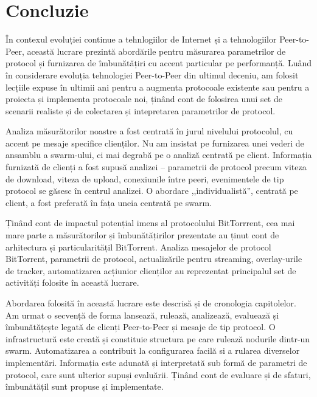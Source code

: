 
\chapter{Concluzie}
\label{chapter:conclusion}

În contexul evoluției continue a tehnlogiilor de Internet și a tehnologiilor
Peer-to-Peer, această lucrare prezintă abordările pentru măsurarea
parametrilor de protocol și furnizarea de îmbunătățiri cu accent particular pe
performanță. Luând în considerare evoluția tehnologiei Peer-to-Peer din
ultimul deceniu, am folosit lecțiile expuse în ultimii ani pentru a augmenta
protocoale existente sau pentru a proiecta și implementa protocoale noi, ținând
cont de folosirea unui set de scenarii realiste și de colectarea și
intepretarea parametrilor de protocol.

Analiza măsurătorilor noastre a fost centrată în jurul nivelului protocolul, cu
accent pe mesaje specifice clienților. Nu am insistat pe furnizarea unei
vederi de ansamblu a swarm-ului, ci mai degrabă pe o analiză centrată pe
client. Informația furnizată de clienți a fost supusă analizei -- parametrii de
protocol precum viteza de download, viteza de upload, conexiunile între peeri,
evenimentele de tip protocol se găsesc în centrul analizei. O abordare
,,individualistă'', centrată pe client, a fost preferată în fața uneia centrată
pe swarm.

Ținând cont de impactul potențial imens al protocolului BitTorrrent, cea mai
mare parte a măsurătorilor și îmbunătățirilor prezentate au ținut cont de
arhitectura și particularitățil BitTorrent. Analiza mesajelor de protocol
BitTorrent, parametrii de protocol, actualizările pentru streaming,
overlay-urile de tracker, automatizarea acțiunior clienților au reprezentat
principalul set de activități folosite în această lucrare.

Abordarea folosită în această lucrare este descrisă și de cronologia
capitolelor. Am urmat o secvență de forma lansează, rulează, analizează,
evaluează și îmbunătățește legată de clienți Peer-to-Peer și mesaje de tip
protocol. O infrastructură este creată și constituie structura pe care rulează
nodurile dintr-un swarm. Automatizarea a contribuit la configurarea facilă si
a rularea diverselor implementări. Informația este adunată și interpretată sub
formă de parametri de protocol, care sunt ulterior supuși evaluării. Ținând
cont de evaluare și de sfaturi, îmbunătățil sunt propuse și implementate.


